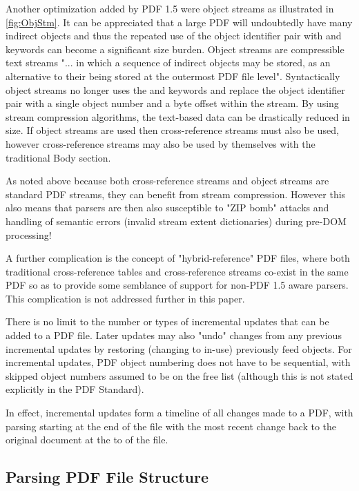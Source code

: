 Another optimization added by PDF 1.5 were object streams as illustrated in \cref{fig:ObjStm}.
It can be appreciated that a large PDF will
undoubtedly have many indirect objects and thus the repeated use of the object identifier pair with   and  keywords can become a significant size burden. Object streams are
compressible text streams "... in which a sequence of indirect objects may be stored, as an 
alternative to their being stored at the outermost PDF file level". 
Syntactically object streams no longer uses the  and  keywords and replace the object identifier pair with a single object number and a byte offset within the stream. 
By using stream compression algorithms, the text-based data can be drastically reduced in size.
If object streams are used then cross-reference streams must also be used, however cross-reference 
streams may also be used by themselves with the traditional Body section.

As noted above because both cross-reference streams and object streams are standard PDF streams, they 
can benefit from stream compression. However this also means that parsers are then also  
susceptible to "ZIP bomb" attacks and handling of semantic errors (invalid stream extent dictionaries) during pre-DOM processing!

A further complication is the concept of "hybrid-reference" PDF files, where both traditional cross-reference tables and cross-reference streams co-exist in the same PDF so as to provide some semblance of support for non-PDF 1.5 aware parsers. This complication is not addressed further in this paper.

There is no limit to the number or types of incremental updates that can be added to a PDF file. Later
updates may also "undo" changes from any previous incremental updates by restoring (changing to in-use)
previously feed objects. For incremental updates, PDF object numbering 
does not have to be sequential, with skipped object numbers assumed to be on
the free list (although this is not stated explicitly in the PDF Standard).

In effect, incremental updates form a timeline of all changes made to a PDF, with parsing starting
at the end of the file with the most recent change back to the original document at the to of the file.

\subsection{Parsing PDF File Structure}
\label{sec:parsingfile}


